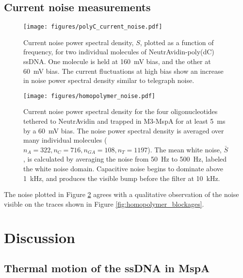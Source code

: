 \subsection{Current noise measurements}

\begin{figure}[h]
\begin{centering}
\texttt{[image: figures/polyC\_current\_noise.pdf]}
\caption[Current fluctuations for single molecule poly(dC) ssDNA]{Current noise power spectral density, $S$, plotted as a function of frequency, for two individual molecules of NeutrAvidin-poly(dC) ssDNA.  One molecule is held at \SI{160}{\mV} bias, and the other at \SI{60}{\mV} bias.  The current fluctuations at high bias show an increase in noise power spectral density similar to telegraph noise.}
\label{fig:polyC_fluctuations}
\end{centering}
\end{figure}

\begin{figure}[h]
\begin{centering}
\texttt{[image: figures/homopolymer\_noise.pdf]}
\caption[Current fluctuations for all homopolymer ssDNA]{Current noise power spectral density for the four oligonucleotides tethered to NeutrAvidin and trapped in M3-MspA for at least \SI{5}{\ms} by a \SI{60}{\mV} bias.  The noise power spectral density is averaged over many individual molecules ($n_A=322, n_C=716, n_{GA}=108, n_T=1197$).  The mean white noise, $\bar{S}$, is calculated by averaging the noise from \SI{50}{\Hz} to \SI{500}{\Hz}, labeled the white noise domain.  Capacitive noise begins to dominate above \SI{1}{\kHz}, and produces the visible bump before the filter at \SI{10}{\kHz}.}
\label{fig:homopolymer_fluctuations}
\end{centering}
\end{figure}

The noise plotted in Figure \ref{fig:homopolymer_fluctuations} agrees with a qualitative observation of the noise visible on the traces shown in Figure \ref{fig:homopolymer_blockages}.

\section{Discussion}

\subsection{Thermal motion of the ssDNA in MspA}

